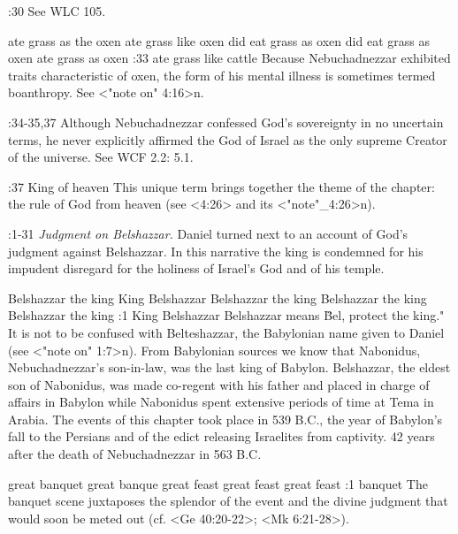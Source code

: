:30 {}  See WLC 105.

    {ate grass as the oxen} %
    {ate grass like oxen} %
    {did eat grass as oxen} %
    {did eat grass as oxen} %
    {ate grass as oxen} %
:33 {ate grass like cattle} Because Nebuchadnezzar exhibited 
traits characteristic of oxen, the form of his mental illness is sometimes termed boanthropy. See
<"note on" 4:16>n. 

:34-35,37 {}  Although Nebuchadnezzar confessed God's sovereignty in no uncertain terms, he never
explicitly affirmed the God of Israel as the only supreme Creator of the universe. See WCF 2.2:
5.1.

:37 {King of heaven} This unique term brings together the theme 
of the chapter: the rule of God from heaven (see <4:26> and its <"note"_4:26>n). 

:1-31 {} {\it Judgment on Belshazzar.\/} Daniel turned next to an account of God's judgment against
Belshazzar. In this narrative the  king is condemned for his impudent disregard for the holiness of
Israel's God and of his temple. 

    {Belshazzar the king} %
    {King Belshazzar} %
    {Belshazzar the king} %
    {Belshazzar the king} %
    {Belshazzar the king} %
:1 {King Belshazzar} Belshazzar means \"Bel, protect the king." It 
is not to be confused with Belteshazzar, the Babylonian name given to Daniel (see <"note on"
1:7>n).
From Babylonian sources we know  that Nabonidus, Nebuchadnezzar's son-in-law, was the last king of 
Babylon. Belshazzar, the eldest son of Nabonidus, was made co-regent with his father and placed in
charge of affairs in Babylon while Nabonidus spent extensive periods of time at Tema in Arabia. The 
events of this chapter took place in 539 B.C., the year of Babylon's 
fall to the Persians and of the edict releasing Israelites from captivity. 42 years after the death
of Nebuchadnezzar in 563 B.C.

    {great banquet} %
    {great banque} %
    {great feast} %
    {great feast} %
    {great feast} %
:1 {banquet} The banquet scene juxtaposes 
the splendor of the event and  the divine judgment that would soon be meted out (cf.
<Ge 40:20-22>; <Mk 6:21-28>).

